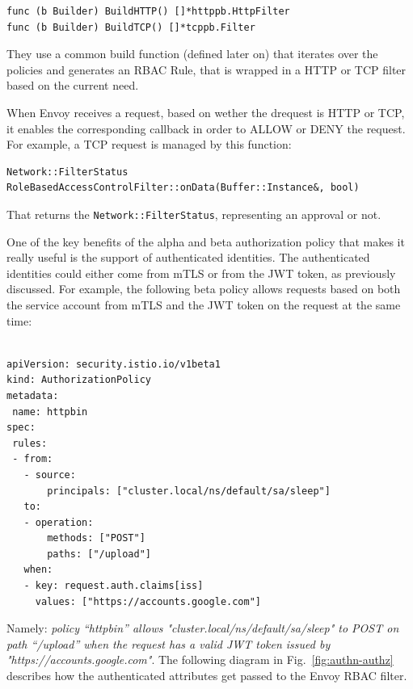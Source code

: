 \begin{lstlisting}[title=\href{https://github.com/istio/istio/blob/4e6e7f49375d84bb35ee614c6b7d38b6c2fd3e7b/pilot/pkg/security/authz/builder/builder.go\#L62-L92}{GitHub permalink}]
func (b Builder) BuildHTTP() []*httppb.HttpFilter
func (b Builder) BuildTCP() []*tcppb.Filter
\end{lstlisting}

\noindent They use a common build function (defined later on) that iterates over the policies and generates an RBAC Rule, that is wrapped in a HTTP or TCP filter based on the current need.

When Envoy receives a request, based on wether the drequest is HTTP or TCP, it enables the corresponding callback in order to ALLOW or DENY the request. For example, a TCP request is managed by this function:

\begin{lstlisting}[title=\href{https://github.com/envoyproxy/envoy/blob/e9207f4f5e93fcec603cf4949763829010836ae2/source/extensions/filters/network/rbac/rbac_filter.cc\#L22-L63}{GitHub permalink}]
Network::FilterStatus RoleBasedAccessControlFilter::onData(Buffer::Instance&, bool)
\end{lstlisting}

That returns the \texttt{Network::FilterStatus}, representing an approval or not.

One of the key benefits of the alpha and beta authorization policy that makes it really useful is the support of authenticated identities. The authenticated identities could either come from mTLS or from the JWT token, as previously discussed.
For example, the following beta policy allows requests based on both the service account from mTLS and the JWT token on the request at the same time:

\begin{lstlisting}

apiVersion: security.istio.io/v1beta1
kind: AuthorizationPolicy
metadata:
 name: httpbin
spec:
 rules:
 - from:
   - source:
       principals: ["cluster.local/ns/default/sa/sleep"]
   to:
   - operation:
       methods: ["POST"]
       paths: ["/upload"]
   when:
   - key: request.auth.claims[iss]
     values: ["https://accounts.google.com"]

\end{lstlisting}

\noindent Namely: \textit{policy “httpbin” allows "cluster.local/ns/default/sa/sleep" to POST on path “/upload” when the request has a valid JWT token issued by "https://accounts.google.com"}. The following diagram in Fig.~\ref{fig:authn-authz} describes how the authenticated attributes get passed to the Envoy RBAC filter.

